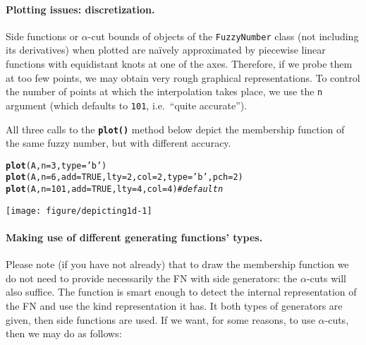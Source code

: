 \documentclass[11pt]{article}\usepackage[]{graphicx}\usepackage[]{color}
\makeatletter
\newcommand{\hlnum}[1]{\textcolor[rgb]{0.686,0.059,0.569}{#1}}%
\newcommand{\hlstr}[1]{\textcolor[rgb]{0.192,0.494,0.8}{#1}}%
\newcommand{\hlcom}[1]{\textcolor[rgb]{0.678,0.584,0.686}{\textit{#1}}}%
\newcommand{\hlstd}[1]{\textcolor[rgb]{0.345,0.345,0.345}{#1}}%
\newcommand{\hlkwc}[1]{\textcolor[rgb]{0.333,0.667,0.333}{#1}}%
\newcommand{\hlkwd}[1]{\textcolor[rgb]{0.737,0.353,0.396}{\textbf{#1}}}%
\newenvironment{kframe}{%
 \def\at@end@of@kframe{}%
 \ifinner\ifhmode%
  \def\at@end@of@kframe{\end{minipage}}%
  \begin{minipage}{\columnwidth}%
 \fi\fi%
 \def\FrameCommand##1{\hskip\@totalleftmargin \hskip-\fboxsep
 \colorbox{shadecolor}{##1}\hskip-\fboxsep
     \hskip-\linewidth \hskip-\@totalleftmargin \hskip\columnwidth}%
 \MakeFramed {\advance\hsize-\width
   \@totalleftmargin\z@ \linewidth\hsize
   \@setminipage}}%
 {\par\unskip\endMakeFramed%
 \at@end@of@kframe}
\newenvironment{knitrout}{}{} %
\newcommand{\func}[1]{\texttt{\hlkwd{#1}}}
\newcommand{\argument}[1]{\texttt{\hlkwc{#1}}}
\makeatother
\begin{document}
\paragraph{Plotting issues: discretization.}
Side functions or $\alpha$-cut bounds of objects of the \texttt{FuzzyNumber}
class (not including its derivatives) when plotted are na\"{i}vely
approximated by piecewise linear functions with equidistant knots
at one of the axes. Therefore, if we probe them
at too few points, we may obtain very rough graphical representations.
To control the number of points at which the interpolation takes place,
we use the \argument{n} argument (which defaults to \texttt{101}, i.e.~``quite
accurate'').

All three calls to the \func{plot()} method below depict the membership
function of the same fuzzy number, but with different accuracy.

\begin{knitrout}\small
{}\color{fgcolor}\begin{kframe}
\begin{alltt}
\hlkwd{plot}\hlstd{(A,} \hlkwc{n}\hlstd{=}\hlnum{3}\hlstd{,} \hlkwc{type}\hlstd{=}\hlstr{'b'}\hlstd{)}
\hlkwd{plot}\hlstd{(A,} \hlkwc{n}\hlstd{=}\hlnum{6}\hlstd{,} \hlkwc{add}\hlstd{=}\hlnum{TRUE}\hlstd{,}  \hlkwc{lty}\hlstd{=}\hlnum{2}\hlstd{,} \hlkwc{col}\hlstd{=}\hlnum{2}\hlstd{,} \hlkwc{type}\hlstd{=}\hlstr{'b'}\hlstd{,} \hlkwc{pch}\hlstd{=}\hlnum{2}\hlstd{)}
\hlkwd{plot}\hlstd{(A,} \hlkwc{n}\hlstd{=}\hlnum{101}\hlstd{,} \hlkwc{add}\hlstd{=}\hlnum{TRUE}\hlstd{,} \hlkwc{lty}\hlstd{=}\hlnum{4}\hlstd{,} \hlkwc{col}\hlstd{=}\hlnum{4}\hlstd{)} \hlcom{# default n}
\end{alltt}
\end{kframe}
\end{knitrout}

\begin{center}
\begin{knitrout}\small
{}\color{fgcolor}

{\centering \texttt{[image: figure/depicting1d-1]} 

}



\end{knitrout}
\end{center}




\paragraph{Making use of different generating functions' types.}
Please note (if you have not already) that to draw the membership
function we do not need to provide necessarily the FN with side generators:
the $\alpha$-cuts will also suffice.
The function is smart enough to detect the internal
representation of the FN and use the kind representation it has.
It both types of generators are given, then side functions are used.
If we want, for some reasons, to use $\alpha$-cuts, then we may do as follows:
\end{document}
